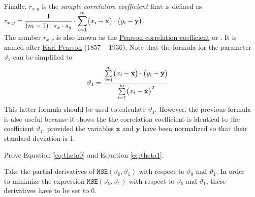 Finally, $r_{x,y}$ is the \emph{\color{blue}sample correlation coefficient} that is defined as
\\[0.2cm]
\hspace*{1.3cm}
$\displaystyle r_{x,y} = \frac{1}{(m-1) \cdot s_x \cdot s_y} \cdot \sum\limits_{i=1}^m \bigl(x_i - \bar{\mathbf{x}}\bigr) \cdot \bigl(y_i - \bar{\mathbf{y}}\bigr)$.
\\[0.2cm]
The number $r_{x,y}$ is also known as the
\href{https://en.wikipedia.org/wiki/Pearson_correlation_coefficient}{Pearson correlation coefficient} or
.  It is named after \href{https://en.wikipedia.org/wiki/Karl_Pearson}{Karl Pearson}
(1857 -- 1936).
Note that the formula for the parameter $\vartheta_1$ can be simplified to  
\begin{equation}
  \label{eq:theta1}
\displaystyle\vartheta_1 = \frac{\sum\limits_{i=1}^m \bigl(x_i - \bar{\mathbf{x}}\bigr) \cdot \bigl(y_i - \bar{\mathbf{y}}\bigr)}{
                        \sum\limits_{i=1}^m \bigl(x_i - \bar{\mathbf{x}}\bigr)^2}  
\end{equation}
This latter formula should be used to calculate $\vartheta_1$.  However, the previous formula is also useful
because it shows the the correlation coefficient is identical to the coefficient $\vartheta_1$, provided the variables $\mathbf{x}$ and
$\mathbf{y}$ have been normalized so that their standard deviation is $1$.

\exercise
Prove Equation \ref{eq:theta0} and Equation \ref{eq:theta1}.

\hint
Take the partial derivatives of $\mathtt{MSE}(\vartheta_0, \vartheta_1)$ with respect to $\vartheta_0$ and
$\vartheta_1$.  In order to minimize the expression  $\mathtt{MSE}(\vartheta_0, \vartheta_1)$ with respect to
$\vartheta_0$ and $\vartheta_1$, these derivatives have to be set to $0$.
\eox
